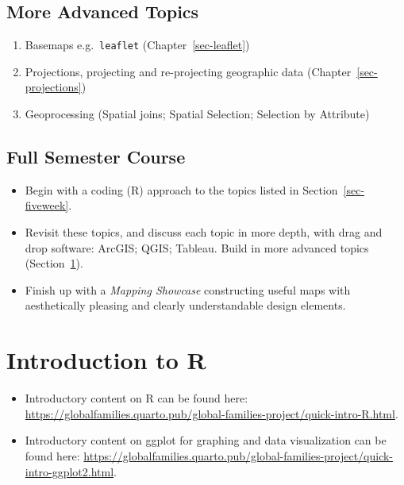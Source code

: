 \documentclass[
  letterpaper,
  DIV=11,
  numbers=noendperiod,
  oneside]{scrreprt}
\providecommand{\tightlist}{%
  \setlength{\itemsep}{0pt}\setlength{\parskip}{0pt}}\usepackage{longtable,booktabs,array}
\begin{document}
\section{More Advanced Topics}\label{sec-moreadvanced}

\begin{enumerate}
\def\labelenumi{\arabic{enumi}.}
\tightlist
\item
  Basemaps e.g.~\texttt{leaflet} (Chapter~\ref{sec-leaflet})
\item
  Projections, projecting and re-projecting geographic data
  (Chapter~\ref{sec-projections})
\item
  Geoprocessing (Spatial joins; Spatial Selection; Selection by
  Attribute)
\end{enumerate}

\section{Full Semester Course}\label{full-semester-course}

\begin{itemize}
\tightlist
\item
  Begin with a coding (R) approach to the topics listed in
  Section~\ref{sec-fiveweek}.
\item
  Revisit these topics, and discuss each topic in more depth, with drag
  and drop software: ArcGIS; QGIS; Tableau. Build in more advanced
  topics (Section~\ref{sec-moreadvanced}).
\item
  Finish up with a \emph{Mapping Showcase} constructing useful maps with
  aesthetically pleasing and clearly understandable design elements.
\end{itemize}

\chapter{Introduction to R}\label{introduction-to-r}

\begin{itemize}
\tightlist
\item
  Introductory content on R can be found here:
  \url{https://globalfamilies.quarto.pub/global-families-project/quick-intro-R.html}.
\item
  Introductory content on ggplot for graphing and data visualization can
  be found here:
  \url{https://globalfamilies.quarto.pub/global-families-project/quick-intro-ggplot2.html}.
\end{itemize}
\end{document}
